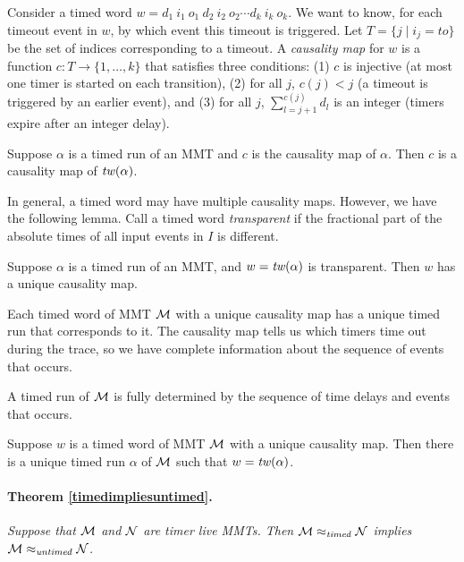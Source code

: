Consider a timed word
$w  =   d_1 ~ i_1 ~ o_1 ~ d_2 ~ i_2 ~ o_2 \cdots d_k ~ i_k ~ o_k$.
We want to know, for each timeout event in $w$, by which event this timeout is triggered.
Let $T = \{ j \mid i_j = \mathit{to} \}$ be the set of indices corresponding to a timeout.
A \emph{causality map} for $w$ is a function $c: T \rightarrow \{ 1 ,\ldots, k \}$ that satisfies three conditions:
(1)
$c$ is injective (at most one timer is started on each transition),
(2)
for all $j$, $c(j) < j$ (a timeout is triggered by an earlier event), and
(3)
for all $j$, $\sum_{l=j+1}^{c(j)} d_l$ is an integer (timers expire after an integer delay).

\begin{lemma}
\label{causality map run is causility map of its timed word}
Suppose $\alpha$ is a timed run of an MMT and $c$ is the causality map of $\alpha$. 
Then $c$ is a causality map of $\mathit{tw}(\alpha)$.
\end{lemma}

In general, a timed word may have multiple causality maps.
However, we have the following lemma.
Call a timed word \emph{transparent} if the fractional part of the absolute times of all input events in $I$ is different.

\begin{lemma}
\label{lemma unique causality map}
Suppose $\alpha$ is a timed run of an MMT, and $w =  \mathit{tw}(\alpha)$ is transparent. 
Then $w$ has a unique causality map.
\end{lemma}

Each timed word of MMT ${\mathcal M}$ with a unique causality map has a unique timed run that corresponds to it.
The causality map tells us which timers time out during the trace, so we have complete information
about the sequence of events that occurs. 

A timed run of ${\mathcal M}$ is fully determined
by the sequence of time delays and events that occurs.

\begin{lemma}
\label{lemma unique timed run}
Suppose $w$ is a timed word of MMT ${\mathcal M}$ with a unique causality map.
Then there is a unique timed run $\alpha$ of ${\mathcal M}$ such that $w = \mathit{tw}(\alpha)$.
\end{lemma}


\paragraph{Theorem \ref{timedimpliesuntimed}.}
\emph{Suppose that ${\mathcal M}$ and ${\mathcal N}$ are timer live MMTs. Then
${\mathcal M} \approx_{\mathit{timed}} {\mathcal N}$
implies
${\mathcal M} \approx_{\mathit{untimed}} {\mathcal N}$.}

